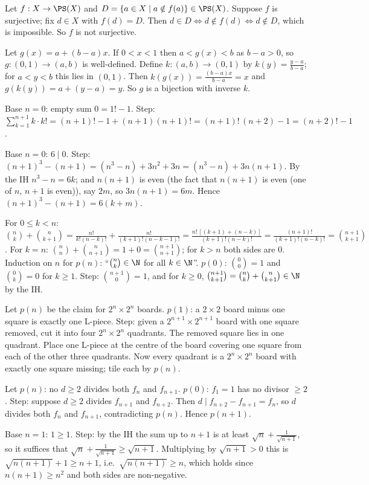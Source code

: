  Let $f:X\to\PS(X)$ and $D=\{a\in X\mid a\notin f(a)\}\in\PS(X)$. Suppose $f$ is surjective; fix $d\in X$ with $f(d)=D$. Then $d\in D\Leftrightarrow d\notin f(d)\Leftrightarrow d\notin D$, which is impossible. So $f$ is not surjective.

 Let $g(x)=a+(b-a)x$. If $0<x<1$ then $a<g(x)<b$ as $b-a>0$, so $g:(0,1)\to(a,b)$ is well-defined. Define $k:(a,b)\to(0,1)$ by $k(y)=\frac{y-a}{b-a}$; for $a<y<b$ this lies in $(0,1)$. Then $k(g(x))=\frac{(b-a)x}{b-a}=x$ and $g(k(y))=a+(y-a)=y$. So $g$ is a bijection with inverse $k$.

 Base $n=0$: empty sum $0=1!-1$. Step: $\sum_{k=1}^{n+1}k\cdot k!=(n+1)!-1+(n+1)(n+1)!=(n+1)!\,(n+2)-1=(n+2)!-1$.

 Base $n=0$: $6\mid0$. Step: $(n+1)^3-(n+1)=(n^3-n)+3n^2+3n=(n^3-n)+3n(n+1)$. By the IH $n^3-n=6k$; and $n(n+1)$ is even (the fact that $n(n+1)$ is even (one of $n$, $n+1$ is even)), say $2m$, so $3n(n+1)=6m$. Hence $(n+1)^3-(n+1)=6(k+m)$.

 For $0\le k<n$: $\binom nk+\binom n{k+1}=\frac{n!}{k!(n-k)!}+\frac{n!}{(k+1)!(n-k-1)!}=\frac{n!\,[(k+1)+(n-k)]}{(k+1)!(n-k)!}=\frac{(n+1)!}{(k+1)!(n-k)!}=\binom{n+1}{k+1}$. For $k=n$: $\binom nn+\binom n{n+1}=1+0=\binom{n+1}{n+1}$; for $k>n$ both sides are $0$. Induction on $n$ for $p(n)$: ``$\binom nk\in\N$ for all $k\in\N$''. $p(0)$: $\binom00=1$ and $\binom0k=0$ for $k\ge1$. Step: $\binom{n+1}0=1$, and for $k\ge0$, $\binom{n+1}{k+1}=\binom nk+\binom n{k+1}\in\N$ by the IH.

 Let $p(n)$ be the claim for $2^n\times2^n$ boards. $p(1)$: a $2\times2$ board minus one square is exactly one L-piece. Step: given a $2^{n+1}\times2^{n+1}$ board with one square removed, cut it into four $2^n\times2^n$ quadrants. The removed square lies in one quadrant. Place one L-piece at the centre of the board covering one square from each of the other three quadrants. Now every quadrant is a $2^n\times2^n$ board with exactly one square missing; tile each by $p(n)$.

 Let $p(n)$: no $d\ge2$ divides both $f_n$ and $f_{n+1}$. $p(0)$: $f_1=1$ has no divisor $\ge2$. Step: suppose $d\ge2$ divides $f_{n+1}$ and $f_{n+2}$. Then $d\mid f_{n+2}-f_{n+1}=f_n$, so $d$ divides both $f_n$ and $f_{n+1}$, contradicting $p(n)$. Hence $p(n+1)$.

 Base $n=1$: $1\ge1$. Step: by the IH the sum up to $n+1$ is at least $\sqrt n+\frac1{\sqrt{n+1}}$, so it suffices that $\sqrt n+\frac1{\sqrt{n+1}}\ge\sqrt{n+1}$. Multiplying by $\sqrt{n+1}>0$ this is $\sqrt{n(n+1)}+1\ge n+1$, i.e.\ $\sqrt{n(n+1)}\ge n$, which holds since $n(n+1)\ge n^2$ and both sides are non-negative.

